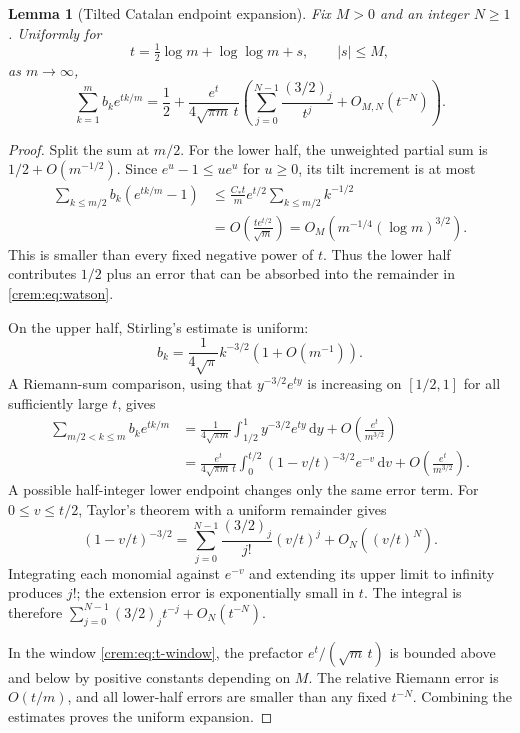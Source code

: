\documentclass[11pt,a4paper]{article}
\newtheorem{lemma}[lemma]{Lemma}
\theoremstyle{definition}\newaliascnt{definition}{theorem}
\theoremstyle{remark}\newaliascnt{remark}{theorem}
\newcommand{\dd}{\mathrm d}
\begin{document}
\begin{lemma}[Tilted Catalan endpoint expansion]\label{crem:lem:watson}
Fix $M>0$ and an integer $N\ge1$. Uniformly for
\begin{equation}
 t=\tfrac12\log m+\log\log m+s,\qquad |s|\le M,
 \label{crem:eq:t-window}
\end{equation}
as $m\to\infty$,
\begin{equation}
 \sum_{k=1}^m b_ke^{tk/m}
 =\frac12+\frac{e^t}{4\sqrt{\pi m}\,t}
 \left(\sum_{j=0}^{N-1}\frac{(3/2)_j}{t^j}
       +O_{M,N}(t^{-N})\right).
 \label{crem:eq:watson}
\end{equation}
\end{lemma}
\begin{proof}
Split the sum at $m/2$. For the lower half, the unweighted partial sum is
$1/2+O(m^{-1/2})$. Since $e^u-1\le ue^u$ for $u\ge0$, its tilt increment is
at most
\begin{align*}
 \sum_{k\le m/2}b_k(e^{tk/m}-1)
 &\le \frac{C_\ast t}{m}e^{t/2}\sum_{k\le m/2}k^{-1/2}\\
 &=O\!\left(\frac{te^{t/2}}{\sqrt m}\right)
 =O_M\!\left(m^{-1/4}(\log m)^{3/2}\right).
\end{align*}
This is smaller than every fixed negative power of $t$. Thus the lower half
contributes $1/2$ plus an error that can be absorbed into the remainder in
\eqref{crem:eq:watson}.

On the upper half, Stirling's estimate is uniform:
\[
 b_k=\frac1{4\sqrt\pi}k^{-3/2}(1+O(m^{-1})).
\]
A Riemann-sum comparison, using that $y^{-3/2}e^{ty}$ is increasing on
$[1/2,1]$ for all sufficiently large $t$, gives
\begin{align*}
 \sum_{m/2<k\le m}b_ke^{tk/m}
 &=\frac1{4\sqrt{\pi m}}
   \int_{1/2}^1 y^{-3/2}e^{ty}\,\dd y
   +O\!\left(\frac{e^t}{m^{3/2}}\right)\\
 &=\frac{e^t}{4\sqrt{\pi m}\,t}
   \int_0^{t/2}(1-v/t)^{-3/2}e^{-v}\,\dd v
   +O\!\left(\frac{e^t}{m^{3/2}}\right).
\end{align*}
A possible half-integer lower endpoint changes only the same error term.
For $0\le v\le t/2$, Taylor's theorem with a uniform remainder gives
\[
 (1-v/t)^{-3/2}
 =\sum_{j=0}^{N-1}\frac{(3/2)_j}{j!}(v/t)^j
   +O_N((v/t)^N).
\]
Integrating each monomial against $e^{-v}$ and extending its upper limit to
infinity produces $j!$; the extension error is exponentially small in $t$.
The integral is therefore $\sum_{j=0}^{N-1}(3/2)_jt^{-j}+O_N(t^{-N})$.

In the window \eqref{crem:eq:t-window}, the prefactor $e^t/(\sqrt m\,t)$ is
bounded above and below by positive constants depending on $M$. The relative
Riemann error is $O(t/m)$, and all lower-half errors are smaller than any
fixed $t^{-N}$. Combining the estimates proves the uniform expansion.
\end{proof}
\end{document}

